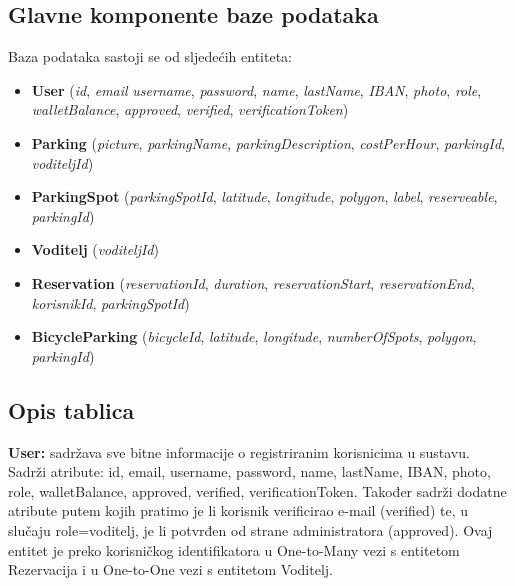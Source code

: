 \subsection{Glavne komponente baze podataka}
Baza podataka sastoji se od sljedećih entiteta:

\begin{itemize}
	\item \textbf{User} \hspace{0.15cm} (\textit{id}, \textit{email} \textit{username}, \textit{password}, \textit{name}, \textit{lastName}, \textit{IBAN}, \textit{photo}, \textit{role}, \textit{walletBalance}, \textit{approved}, \textit{verified}, \textit{verificationToken})
	
	
	\item \textbf{Parking} (\textit{picture}, \textit{parkingName}, \textit{parkingDescription}, \textit{costPerHour}, \textit{parkingId}, \textit{voditeljId}) 
	
	\item \textbf{ParkingSpot} (\textit{parkingSpotId}, \textit{latitude}, \textit{longitude}, \textit{polygon}, \textit{label}, \textit{reserveable}, \textit{parkingId})
	
	\item \textbf{Voditelj} (\textit{voditeljId})
	
	\item \textbf{Reservation} (\textit{reservationId}, \textit{duration}, \textit{reservationStart}, \textit{reservationEnd}, \textit{korisnikId}, \textit{parkingSpotId})
	
	\item \textbf{BicycleParking} (\textit{bicycleId}, \textit{latitude}, \textit{longitude}, \textit{numberOfSpots}, \textit{polygon}, \textit{parkingId})
\end{itemize}



\subsection{Opis tablica}





\textbf{User:} sadržava sve bitne informacije o registriranim korisnicima u sustavu. Sadrži atribute: id, email, username, password, name, lastName, IBAN, photo, role, walletBalance, approved, verified, verificationToken. Također sadrži dodatne atribute putem kojih pratimo je li korisnik verificirao e-mail (verified) te, u slučaju
role=voditelj, je li potvrđen od strane administratora (approved).
Ovaj entitet je preko korisničkog identifikatora u One-to-Many vezi s entitetom Rezervacija i u One-to-One vezi s entitetom Voditelj.

